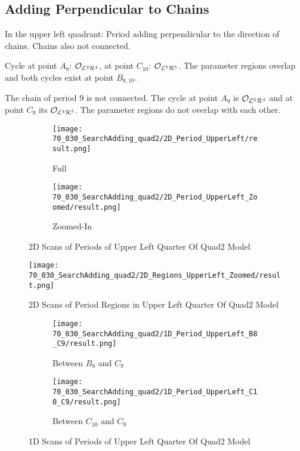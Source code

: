 \subsection{Adding Perpendicular to Chains}

In the upper left quadrant: Period adding perpendicular to the direction of chains.
Chains also not connected.

Cycle at point $A_8$: $\mathcal{O}_{\mathcal{L}^4\mathcal{R}^4}$, at point $C_{10}$: $\mathcal{O}_{\mathcal{L}^5\mathcal{R}^5}$.
The parameter regions overlap and both cycles exist at point $B_{8, 10}$.

The chain of period 9 is not connected.
The cycle at point $A_9$ is $\mathcal{O}_{\mathcal{L}^5\mathcal{R}^4}$ and at point $C_9$ its $\mathcal{O}_{\mathcal{L}^4\mathcal{R}^5}$.
The parameter regions do not overlap with each other.

\begin{figure}
    \centering
    \begin{subfigure}{0.4\textwidth}
        \centering
        \texttt{[image: 70\_030\_SearchAdding\_quad2/2D\_Period\_UpperLeft/result.png]}
        \caption{Full}
    \end{subfigure}
    \begin{subfigure}{0.4\textwidth}
        \centering
        \texttt{[image: 70\_030\_SearchAdding\_quad2/2D\_Period\_UpperLeft\_Zoomed/result.png]}
        \caption{Zoomed-In}
    \end{subfigure}
    \caption{2D Scans of Periods of Upper Left Quarter Of Quad2 Model}
\end{figure}

\begin{figure}
    \centering
    \texttt{[image: 70\_030\_SearchAdding\_quad2/2D\_Regions\_UpperLeft\_Zoomed/result.png]}
    \caption{2D Scans of Period Regions in Upper Left Quarter Of Quad2 Model}
\end{figure}

\begin{figure}
    \centering
    \begin{subfigure}{0.4\textwidth}
        \centering
        \texttt{[image: 70\_030\_SearchAdding\_quad2/1D\_Period\_UpperLeft\_B8\_C9/result.png]}
        \caption{Between $B_8$ and $C_9$}
    \end{subfigure}
    \begin{subfigure}{0.4\textwidth}
        \centering
        \texttt{[image: 70\_030\_SearchAdding\_quad2/1D\_Period\_UpperLeft\_C10\_C9/result.png]}
        \caption{Between $C_{10}$ and $C_9$}
    \end{subfigure}
    \caption{1D Scans of Periods of Upper Left Quarter Of Quad2 Model}
\end{figure}


